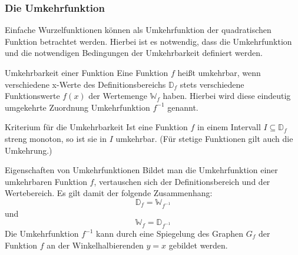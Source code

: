 \subsubsection{Die Umkehrfunktion}
  Einfache Wurzelfunktionen können als Umkehrfunktion der quadratischen Funktion betrachtet werden. Hierbei ist es notwendig, dass die Umkehrfunktion und die notwendigen Bedingungen der Umkehrbarkeit definiert werden. 
  \begin{defi}{Umkehrbarkeit einer Funktion}{}
Eine Funktion $f$ heißt umkehrbar, wenn verschiedene x-Werte des Definitionsbereichs $\mathds{D}_f$ stets verschiedene Funktionswerte $f(x)$ der Wertemenge $ \mathds{W}_f$ haben. Hierbei wird diese eindeutig umgekehrte Zuordnung Umkehrfunktion $f^{-1}$ genannt.
  \end{defi}
\begin{merke}{Kriterium für die Umkehrbarkeit}{}
Ist eine Funktion $f$ in einem Intervall $I\subseteq \mathds{D}_f$ streng monoton, so ist sie in $I$ umkehrbar. (Für stetige Funktionen gilt auch die Umkehrung.) 
\end{merke}
\begin{b8d}{Eigenschaften von Umkehrfunktionen}{}
Bildet man die Umkehrfunktion einer umkehrbaren Funktion $f$, vertauschen sich der Definitionsbereich und der Wertebereich. Es gilt damit der folgende Zusammenhang: $$\mathds{D}_f = \mathds{W}_{f^{-1}}$$ und $$\mathds{W}_{f} = \mathds{D}_{f^{-1}}$$
Die Umkehrfunktion $f^{-1}$ kann durch eine Spiegelung des Graphen $G_f$ der Funktion $f$ an der Winkelhalbierenden $y= x$ gebildet werden.
\end{b8d}
